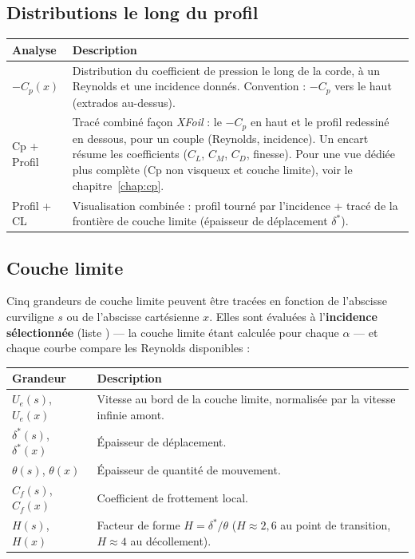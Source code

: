 \subsection{Distributions le long du profil}

\begin{tabularx}{\linewidth}{l X}
    \toprule
    \textbf{Analyse} & \textbf{Description} \\
    \midrule
    $-C_p(x)$ & Distribution du coefficient de pression le long
               de la corde, à un Reynolds et une incidence donnés.
               Convention : $-C_p$ vers le haut (extrados au-dessus). \\
    Cp + Profil & Tracé combiné façon \emph{XFoil} : le $-C_p$ en haut
               et le profil redessiné en dessous, pour un couple
               (Reynolds, incidence). Un encart résume les coefficients
               ($C_L$, $C_M$, $C_D$, finesse). Pour une vue dédiée plus
               complète (Cp non visqueux et couche limite), voir le
               chapitre~\ref{chap:cp}. \\
    Profil + CL & Visualisation combinée : profil tourné par
               l'incidence + tracé de la frontière de couche
               limite (épaisseur de déplacement $\delta^*$).\\
    \bottomrule
\end{tabularx}

\subsection{Couche limite}

Cinq grandeurs de couche limite peuvent être tracées en fonction
de l'abscisse curviligne $s$ ou de l'abscisse cartésienne $x$. Elles
sont évaluées à l'\textbf{incidence sélectionnée} (liste )
— la couche limite étant calculée pour chaque $\alpha$ — et chaque
courbe compare les Reynolds disponibles :

\begin{tabularx}{\linewidth}{l X}
    \toprule
    \textbf{Grandeur} & \textbf{Description} \\
    \midrule
    $U_e(s)$, $U_e(x)$
        & Vitesse au bord de la couche limite,
          normalisée par la vitesse infinie amont.\\
    $\delta^*(s)$, $\delta^*(x)$
        & Épaisseur de déplacement.\\
    $\theta(s)$, $\theta(x)$
        & Épaisseur de quantité de mouvement.\\
    $C_f(s)$, $C_f(x)$
        & Coefficient de frottement local.\\
    $H(s)$, $H(x)$
        & Facteur de forme $H = \delta^*/\theta$ ($H \approx 2{,}6$
          au point de transition, $H \approx 4$ au décollement).\\
    \bottomrule
\end{tabularx}

